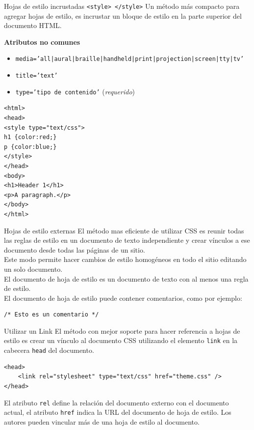 \begin{frame}[fragile]{Hojas de estilo incrustadas \texttt{<style> </style>}} %
    Un método más compacto para agregar hojas de estilo,  es incrustar un
    bloque de estilo en la parte superior del documento HTML. 

    \textbf{Atributos no comunes}
    \begin{itemize}
        \item \texttt{media='all|aural|braille|handheld|print|projection|screen|tty|tv'}
        \item \texttt{title='text'}
        \item \texttt{type='tipo de contenido'} (\textit{requerido})
    \end{itemize}

    \begin{lstlisting}
<html>
<head>
<style type="text/css">
h1 {color:red;}
p {color:blue;}
</style>
</head>
<body>
<h1>Header 1</h1>
<p>A paragraph.</p>
</body>
</html>
    \end{lstlisting}

\end{frame}


\begin{frame}[fragile]{Hojas de estilo externas} %
    El método mas eficiente de utilizar CSS es reunir todas las reglas de
    estilo en un documento de texto independiente y crear vínculos a ese
    documento desde todas las páginas de un sitio. \\[0.5cm]

    Este modo permite hacer cambios de estilo homogéneos en todo el sitio
    editando un solo documento. \\[0.5cm]

    El documento de hoja de estilo es un documento de texto con al menos una
    regla de estilo. \\[0.5cm]

    El documento de hoja de estilo puede contener comentarios, como por
    ejemplo: 

    \begin{lstlisting}
/* Esto es un comentario */
    \end{lstlisting}
\end{frame}

\begin{frame}[fragile]{Utilizar un Link} %
    El método con mejor soporte para hacer referencia a hojas de estilo es
    crear un vínculo al documento CSS utilizando el elemento \texttt{link} en
    la cabecera \texttt{head} del documento. 

\begin{lstlisting}
<head>
    <link rel="stylesheet" type="text/css" href="theme.css" />
</head>
\end{lstlisting}
    
    El atributo \texttt{rel} define la relación del documento externo con el
    documento actual, el atributo \texttt{href} indica la URL del documento de
    hoja de estilo. Los autores pueden vincular más de una hoja de estilo al
    documento. 
\end{frame}

